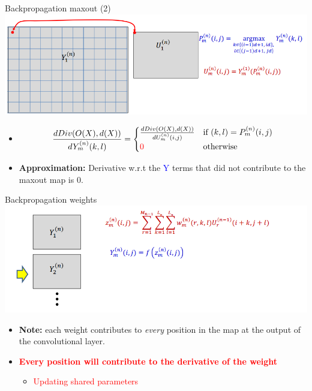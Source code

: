 \documentclass[default, aspectratio=169]{beamer}
\begin{document}
	\begin{frame}{Backpropagation maxout (2)}
		\centering
		\includegraphics[keepaspectratio, scale=0.6]{pic/training4.png}
		\smallskip
		
		\begin{itemize}
			\item \[
			\frac{dDiv(O(X), d(X))}{dY^{(n)}_m (k,l)} = 
			\begin{cases} 
				\frac{dDiv(O(X), d(X))}{dU^{(n)}_m (i,j)} & \text{if } (k,l) = P^{(n)}_m (i,j) \\
				\textcolor{red}{0} & \text{otherwise}
			\end{cases}
			\]
			\item \textbf{Approximation:} Derivative w.r.t the \textcolor{blue}{Y} terms that did not contribute to the maxout map is 0.
		\end{itemize}
		
	\end{frame}
	\begin{frame}{Backpropagation weights}
		\centering
		\includegraphics[keepaspectratio, scale=0.6]{pic/training5.png}
		\smallskip
		
		\begin{itemize}
			\item \textbf{Note:} each weight contributes to \textit{every} position in the map at the output of the convolutional layer.
			\item \textcolor{red}{\textbf{Every position will contribute to the derivative of the weight}}
			\begin{itemize}
				\item \textcolor{red}{Updating shared parameters}
				
			\end{itemize}
		\end{itemize}
		
		
	\end{frame}
	
\end{document}
